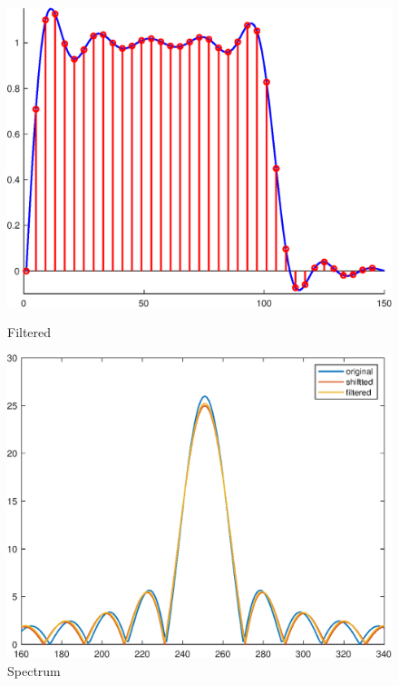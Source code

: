 \documentclass{article}
\begin{document}
\begin{figure}[H]
	\begin{minipage}[b]{0.46\linewidth}
		\includegraphics[width=\linewidth]{p3_time.eps}
		\caption{Filtered}
		\label{filtered}
	\end{minipage}
	\begin{minipage}[b]{0.46\linewidth}
		\includegraphics[width=\linewidth]{spectrum.eps}
		\caption{Spectrum}
		\label{spectrum}
	\end{minipage}
	\begin{minipage}[b]{0.46\linewidth}

\end{minipage}
\end{figure}
\end{document}
